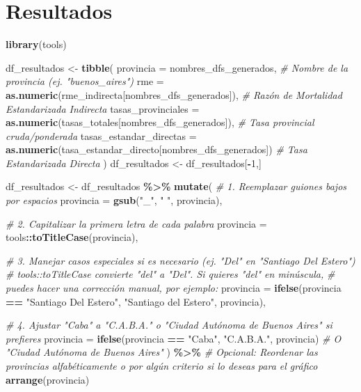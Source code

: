 \documentclass[
]{article}
\newenvironment{Shaded}{\begin{snugshade}}{\end{snugshade}}
\newcommand{\AttributeTok}[1]{\textcolor[rgb]{0.13,0.29,0.53}{#1}}
\newcommand{\CommentTok}[1]{\textcolor[rgb]{0.56,0.35,0.01}{\textit{#1}}}
\newcommand{\DecValTok}[1]{\textcolor[rgb]{0.00,0.00,0.81}{#1}}
\newcommand{\FunctionTok}[1]{\textcolor[rgb]{0.13,0.29,0.53}{\textbf{#1}}}
\newcommand{\NormalTok}[1]{#1}
\newcommand{\OtherTok}[1]{\textcolor[rgb]{0.56,0.35,0.01}{#1}}
\newcommand{\SpecialCharTok}[1]{\textcolor[rgb]{0.81,0.36,0.00}{\textbf{#1}}}
\newcommand{\StringTok}[1]{\textcolor[rgb]{0.31,0.60,0.02}{#1}}
\begin{document}
\section{Resultados}\label{resultados}

\begin{Shaded}
\begin{Highlighting}[]
\FunctionTok{library}\NormalTok{(tools)}

\NormalTok{df\_resultados }\OtherTok{\textless{}{-}} \FunctionTok{tibble}\NormalTok{(}
  \AttributeTok{provincia =}\NormalTok{ nombres\_dfs\_generados, }\CommentTok{\# Nombre de la provincia (ej. "buenos\_aires")}
  \AttributeTok{rme =} \FunctionTok{as.numeric}\NormalTok{(rme\_indirecta[nombres\_dfs\_generados]), }\CommentTok{\# Razón de Mortalidad Estandarizada Indirecta}
  \AttributeTok{tasas\_provinciales =} \FunctionTok{as.numeric}\NormalTok{(tasas\_totales[nombres\_dfs\_generados]), }\CommentTok{\# Tasa provincial cruda/ponderada}
  \AttributeTok{tasas\_estandar\_directas =} \FunctionTok{as.numeric}\NormalTok{(tasa\_estandar\_directo[nombres\_dfs\_generados]) }\CommentTok{\# Tasa Estandarizada Directa}
\NormalTok{)}
\NormalTok{df\_resultados }\OtherTok{\textless{}{-}}\NormalTok{ df\_resultados[}\SpecialCharTok{{-}}\DecValTok{1}\NormalTok{,]}

\NormalTok{df\_resultados }\OtherTok{\textless{}{-}}\NormalTok{ df\_resultados }\SpecialCharTok{\%\textgreater{}\%}
  \FunctionTok{mutate}\NormalTok{(}
    \CommentTok{\# 1. Reemplazar guiones bajos por espacios}
    \AttributeTok{provincia =} \FunctionTok{gsub}\NormalTok{(}\StringTok{"\_"}\NormalTok{, }\StringTok{" "}\NormalTok{, provincia),}
    
    \CommentTok{\# 2. Capitalizar la primera letra de cada palabra}
    \AttributeTok{provincia =}\NormalTok{ tools}\SpecialCharTok{::}\FunctionTok{toTitleCase}\NormalTok{(provincia),}
    
    \CommentTok{\# 3. Manejar casos especiales si es necesario (ej. "Del" en "Santiago Del Estero")}
    \CommentTok{\# tools::toTitleCase convierte "del" a "Del". Si quieres "del" en minúscula,}
    \CommentTok{\# puedes hacer una corrección manual, por ejemplo:}
    \AttributeTok{provincia =} \FunctionTok{ifelse}\NormalTok{(provincia }\SpecialCharTok{==} \StringTok{"Santiago Del Estero"}\NormalTok{, }\StringTok{"Santiago del Estero"}\NormalTok{, provincia),}
    
    \CommentTok{\# 4. Ajustar "Caba" a "C.A.B.A." o "Ciudad Autónoma de Buenos Aires" si prefieres}
    \AttributeTok{provincia =} \FunctionTok{ifelse}\NormalTok{(provincia }\SpecialCharTok{==} \StringTok{"Caba"}\NormalTok{, }\StringTok{"C.A.B.A."}\NormalTok{, provincia) }\CommentTok{\# O "Ciudad Autónoma de Buenos Aires"}
\NormalTok{  ) }\SpecialCharTok{\%\textgreater{}\%}
  \CommentTok{\# Opcional: Reordenar las provincias alfabéticamente o por algún criterio si lo deseas para el gráfico}
  \FunctionTok{arrange}\NormalTok{(provincia)}
\end{Highlighting}
\end{Shaded}
\end{document}

